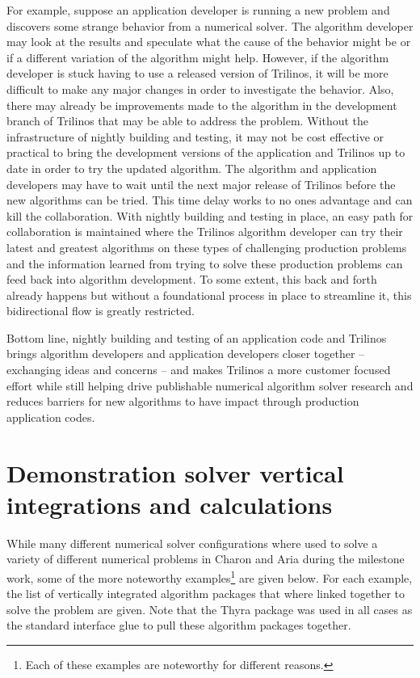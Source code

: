 \documentclass[pdf,ps2pdf,11pt]{SANDreport}
\begin{document}
For example, suppose an application developer is running a new problem and
discovers some strange behavior from a numerical solver.  The algorithm
developer may look at the results and speculate what the cause of the behavior
might be or if a different variation of the algorithm might help.
However, if the algorithm developer is stuck having to use a released version
of Trilinos, it will be more difficult to make any major changes in order to
investigate the behavior.  Also, there may already be improvements made to the
algorithm in the development branch of Trilinos that may be able to address
the problem.  Without the infrastructure of nightly building and testing, it
may not be cost effective or practical to bring the development versions of
the application and Trilinos up to date in order to try the updated algorithm.
The algorithm and application developers may have to wait until the next major
release of Trilinos before the new algorithms can be tried.  This time delay
works to no ones advantage and can kill the collaboration.  With nightly
building and testing in place, an easy path for collaboration is maintained
where the Trilinos algorithm developer can try their latest and greatest
algorithms on these types of challenging production problems and the
information learned from trying to solve these production problems can feed
back into algorithm development.  To some extent, this back and forth already
happens but without a foundational process in place to streamline it, this
bidirectional flow is greatly restricted.

Bottom line, nightly building and testing of an application code and Trilinos
brings algorithm developers and application developers closer together --
exchanging ideas and concerns -- and makes Trilinos a more customer focused
effort while still helping drive publishable numerical algorithm solver
research and reduces barriers for new algorithms to have impact through
production application codes.



%
\section{Demonstration solver vertical integrations and calculations}
\label{sec:demonstration}
%

While many different numerical solver configurations where used to solve a
variety of different numerical problems in Charon and Aria during the
milestone work, some of the more noteworthy examples\footnote{Each of these
examples are noteworthy for different reasons.} are given below.  For each
example, the list of vertically integrated algorithm packages that where
linked together to solve the problem are given.  Note that the Thyra package
was used in all cases as the standard interface glue to pull these algorithm
packages together.
\end{document}
